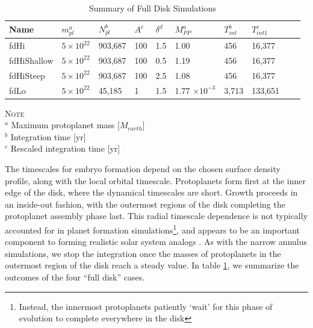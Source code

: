 \documentclass[twocolumn,linenumbers]{aastex63}
\begin{document}
\begin{table}
\caption{Summary of Full Disk Simulations}
\begin{tabular}{llllllllll} \hline \hline
Name     & $m_{pl}^{a}$ & $N_{pl}^{b}$ & $A^{c}$ & $\delta^{d}$ & $M_{PP}^a$ & $T_{int}^b$ & $T_{int 1}^c$ &  \\ \hline
fdHi                 & $5 \times 10^{22}$ & 903,687 & 100                                                         & 1.5                              &  1.00                                                         & 456                              & 16,377  &  \\
fdHiShallow    & $5 \times 10^{22}$ & 903,687 & 100                                                        & 0.5                              &  1.19                                                        & 456                              & 16,377  &  \\
fdHiSteep       & $5 \times 10^{22}$ & 903,687 & 100                                                         & 2.5                              &  1.08                                                         & 456                              & 16,377 &  \\
fdLo                & $5 \times 10^{22}$ & 45,185    & 1                                                             & 1.5                              &  1.77 $\times 10^{-3}$                                  & 3,713                              & 133,651 &  \\ \hline
\end{tabular}
\label{tab:sim_properties}
\begin{flushleft}
\textsc{Note} \\ {$^a$ Maximum protoplanet mass [$M_{earth}$] \\
		       $^b$ Integration time [yr] \\
		       $^c$ Rescaled integration time [yr]} \\
\end{flushleft}
\end{table}

The timescales for embryo formation depend on
the chosen surface density profile, along with the local orbital
timescale. Protoplanets form first at the inner edge of the disk,
where the dynamical timescales are short. Growth proceeds in an
inside-out fashion, with the outermost regions of the disk completing
the protoplanet assembly phase last. This radial timescale dependence is not typically
accounted for in planet formation simulations\footnote{Instead, the innermost protoplanets 
patiently `wait' for this phase of evolution to complete everywhere in the disk}, and appears to be an
important component to forming realistic solar system analogs
\citep{clement20}. As with the narrow annulus simulations, we stop the
integration once the masses of protoplanets in the outermost region of
the disk reach a steady value. In table \ref{tab:sim_properties}, we
summarize the outcomes of the four ``full disk'' cases.
\end{document}
